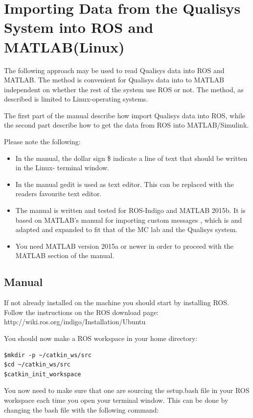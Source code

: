 \documentclass[a4paper,twoside,english]{report}
\begin{document}
\clearpage{}

\section{Importing Data from the Qualisys System into ROS and MATLAB(Linux)}
The following approach may be used to read Qualisys data into ROS
and MATLAB. The method is convenient for Qualisys data into to MATLAB
independent on whether the rest of the system use ROS or not. The
method, as described is limited to Linux-operating systems.

The first part of the manual describe how import Qualisys data into
ROS, while the second part describe how to get the data from ROS into
MATLAB/Simulink.

Please note the following: 
\begin{itemize}
\item In the manual, the dollar sign \$ indicate a line of text that should
be written in the Linux- terminal window.
\item In the manual gedit is used as text editor. This can be replaced with
the readers favourite text editor.
\item The manual is written and tested for ROS-Indigo and MATLAB 2015b.
It is based on MATLAB's manual for importing custom messages \citep{MathWorks2016},
which is and adapted and expanded to fit that of the MC lab and the
Qualisys system.
\item You need MATLAB version 2015a or newer in order to proceed with the
MATLAB section of the manual.
\end{itemize}

\subsection{Manual}

If not already installed on the machine you should start by installing
ROS. Follow the instructions on the ROS download page: http://wiki.ros.org/indigo/Installation/Ubuntu

You should now make a ROS workspace in your home directory:

\begin{verbatim}$mkdir -p ~/catkin_ws/src 
$cd ~/catkin_ws/src
$catkin_init_workspace\end{verbatim}

You now need to make sure that one are sourcing the setup.bash file
in your ROS workspace each time you open your terminal window. This
can be done by changing the bash file with the following command:
\end{document}
